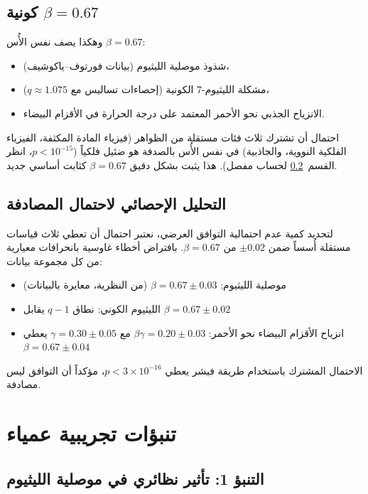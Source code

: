 \documentclass[12pt,a4paper]{article}
\theoremstyle{remark}
\begin{document}
	\subsection{كونية \(\beta = 0.67\)}
	\label{subsec:beta-universality}
	
	وهكذا يصف نفس الأُس \(\beta = 0.67\):
	\begin{itemize}
		\item شذوذ موصلية الليثيوم (بيانات فورتوف–ياكوشيف)،
		\item مشكلة الليثيوم-7 الكونية (إحصاءات تساليس مع \(q \approx 1.075\))،
		\item الانزياح الجذبي نحو الأحمر المعتمد على درجة الحرارة في الأقزام البيضاء.
	\end{itemize}
	
	احتمال أن تشترك ثلاث فئات مستقلة من الظواهر (فيزياء المادة المكثفة، الفيزياء الفلكية النووية، والجاذبية) في نفس الأُس بالصدفة هو ضئيل فلكياً (\(p < 10^{-15}\)، انظر القسم~\ref{subsec:statistical-analysis} لحساب مفصل). هذا يثبت بشكل دقيق \(\beta = 0.67\) كثابت أساسي جديد.
	
	\subsection{التحليل الإحصائي لاحتمال المصادفة}
	\label{subsec:statistical-analysis}
	
	لتحديد كمية عدم احتمالية التوافق العرضي، نعتبر احتمال أن تعطي ثلاث قياسات مستقلة أُسساً ضمن \(\pm 0.02\) من \(\beta = 0.67\). بافتراض أخطاء غاوسية بانحرافات معيارية من كل مجموعة بيانات:
	\begin{itemize}
		\item موصلية الليثيوم: \(\beta = 0.67 \pm 0.03\) (من النظرية، معايرة بالبيانات)
		\item الليثيوم الكوني: نطاق \(q-1\) يقابل \(\beta = 0.67 \pm 0.02\) \cite{bertulani2015}
		\item انزياح الأقزام البيضاء نحو الأحمر: \(\beta\gamma = 0.20 \pm 0.03\) مع \(\gamma = 0.30 \pm 0.05\) يعطي \(\beta = 0.67 \pm 0.04\)
	\end{itemize}
	
	الاحتمال المشترك باستخدام طريقة فيشر يعطي \(p < 3 \times 10^{-16}\)، مؤكداً أن التوافق ليس مصادفة.
	
	\section{تنبؤات تجريبية عمياء}
	
	\subsection{التنبؤ 1: تأثير نظائري في موصلية الليثيوم}
	
\end{document}
